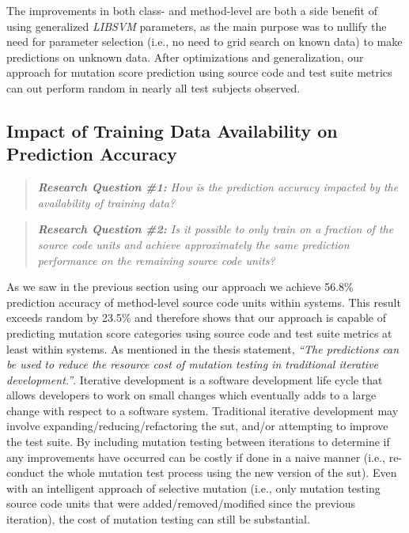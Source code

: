 The improvements in both class- and method-level are both a side benefit of using generalized \emph{LIBSVM} parameters, as the main purpose was to nullify the need for parameter selection (i.e., no need to grid search on known data) to make predictions on unknown data. After optimizations and generalization, our approach for mutation score prediction using source code and test suite metrics can out perform random in nearly all test subjects observed. 

\subsection{Impact of Training Data Availability on Prediction Accuracy}
\label{subsec:experiment_data}
\begin{quote}
  \emph{\textbf{Research Question \#1:} How is the prediction accuracy impacted by the availability of training data?}
\end{quote}

\begin{quote}
  \emph{\textbf{Research Question \#2:} Is it possible to only train on a fraction of the source code units and achieve approximately the same prediction performance on the remaining source code units?}
\end{quote}

\noindent
As we saw in the previous section using our approach we achieve 56.8\% prediction accuracy of method-level source code units within systems. This result exceeds random by 23.5\% and therefore shows that our approach is capable of predicting mutation score categories using source code and test suite metrics at least within systems. As mentioned in the thesis statement, \emph{``The predictions can be used to reduce the resource cost of mutation testing in traditional iterative development.''}. Iterative development is a software development life cycle that allows developers to work on small changes which eventually adds to a large change with respect to a software system. Traditional iterative development may involve expanding/reducing/refactoring the \gls{sut}, and/or attempting to improve the test suite. By including mutation testing between iterations to determine if any improvements have occurred can be costly if done in a naive manner (i.e., re-conduct the whole mutation test process using the new version of the \gls{sut}). Even with an intelligent approach of selective mutation (i.e., only mutation testing source code units that were added/removed/modified since the previous iteration), the cost of mutation testing can still be substantial.

